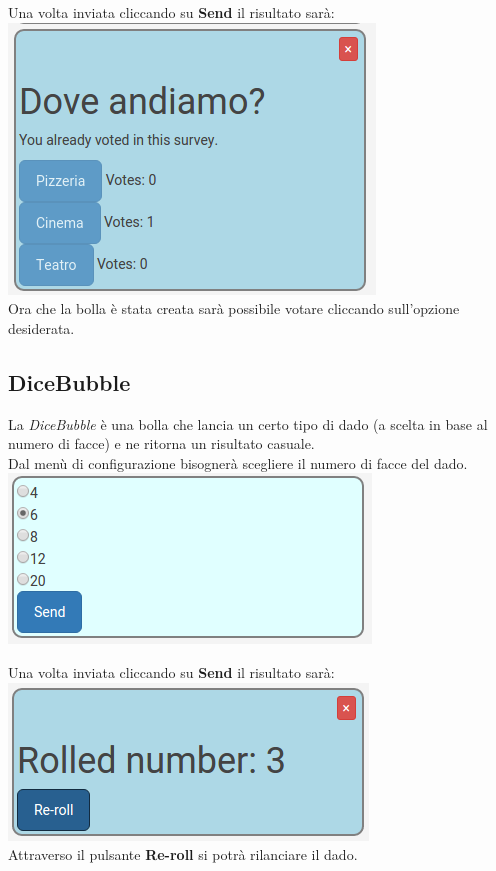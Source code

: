 Una volta inviata cliccando su \textbf{Send} il risultato sarà:\\

\includegraphics[scale=0.74]{img/poll.png}
\\
Ora che la bolla è stata creata sarà possibile votare cliccando sull'opzione desiderata.
\subsection{DiceBubble}
La \textit{DiceBubble} è una bolla che lancia un certo tipo di dado (a scelta in base al numero di facce) e ne ritorna un risultato casuale.\\
Dal menù di configurazione bisognerà scegliere il numero di facce del dado.\\

\includegraphics[scale=0.75]{img/randConfig.png}

Una volta inviata cliccando su \textbf{Send} il risultato sarà:\\

\includegraphics[scale=0.75]{img/rand.png}
\\
Attraverso il pulsante \textbf{Re-roll} si potrà rilanciare il dado.

